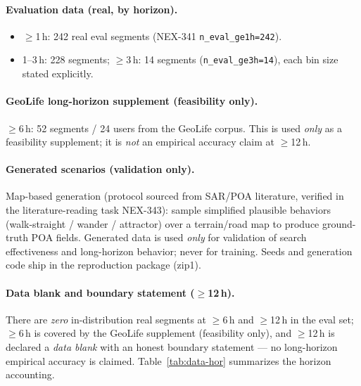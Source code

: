 \documentclass[11pt]{article}
\begin{document}
\paragraph{Evaluation data (real, by horizon).}
\begin{itemize}
\item $\ge$1\,h: 242 real eval segments (NEX-341 \texttt{n\_eval\_ge1h=242}).
\item 1--3\,h: 228 segments; $\ge$3\,h: 14 segments
(\texttt{n\_eval\_ge3h=14}), each bin size stated explicitly.
\end{itemize}

\paragraph{GeoLife long-horizon supplement (feasibility only).}
$\ge$6\,h: 52 segments / 24 users from the GeoLife corpus.  This is used
\emph{only} as a feasibility supplement; it is \emph{not} an empirical
accuracy claim at $\ge$12\,h.

\paragraph{Generated scenarios (validation only).}
Map-based generation (protocol sourced from SAR/POA literature, verified in
the literature-reading task NEX-343): sample simplified plausible behaviors
(walk-straight / wander / attractor) over a terrain/road map to produce
ground-truth POA fields.  Generated data is used \emph{only} for validation
of search effectiveness and long-horizon behavior; never for training.
Seeds and generation code ship in the reproduction package (zip1).

\paragraph{Data blank and boundary statement ($\ge$12\,h).}
There are \emph{zero} in-distribution real segments at $\ge$6\,h and
$\ge$12\,h in the eval set; $\ge$6\,h is covered by the GeoLife supplement
(feasibility only), and $\ge$12\,h is declared a \emph{data blank} with an
honest boundary statement --- no long-horizon empirical accuracy is claimed.
Table~\ref{tab:data-hor} summarizes the horizon accounting.
\end{document}

